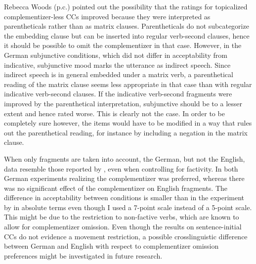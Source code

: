 Rebecca Woods (p.c.) pointed out the possibility that the ratings for topicalized complementizer-less CCs improved because they were interpreted as parentheticals rather than as matrix clauses. Parentheticals do not subcategorize the embedding clause but can be inserted into regular verb-second clauses, hence it should be possible to omit the complementizer in that case. However, in the German subjunctive conditions, which did not differ in acceptability from indicative, subjunctive mood marks the utterance as indirect speech. Since indirect speech is in general embedded under a matrix verb, a parenthetical reading of the matrix clause seems less appropriate in that case than with regular indicative verb-second clauses. If the indicative verb-second fragments were improved by the parenthetical interpretation, subjunctive should be to a lesser extent and hence rated worse. This is clearly not the case. In order to be completely sure however, the items would have to be modified in a way that rules out the parenthetical reading, for instance by including a negation in the matrix clause.

When only fragments are taken into account, the German, but not the English, data resemble those reported by \citet{merchant.etal2013}, even when controlling for factivity. In both German experiments realizing the complementizer was preferred, whereas there was no significant effect of the complementizer on English fragments. The difference in acceptability between conditions is smaller than in the experiment by \citet{merchant.etal2013} in absolute terms even though I used a 7-point scale instead of a 5-point scale. This might be due to the restriction to non-factive verbs, which are known to allow for complementizer omission. Even though the results on sentence-initial CCs do not evidence a movement restriction, a possible crosslinguistic difference between German and English with respect to complementizer omission preferences might be investigated in future research.

